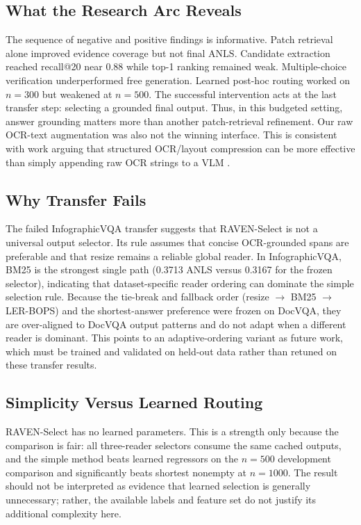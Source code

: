 \documentclass[journal]{IEEEtran}
\begin{document}
\subsection{What the Research Arc Reveals}
The sequence of negative and positive findings is informative.  Patch retrieval
alone improved evidence coverage but not final ANLS.  Candidate extraction
reached recall@20 near 0.88 while top-1 ranking remained weak.  Multiple-choice
verification underperformed free generation.  Learned post-hoc routing worked
on $n=300$ but weakened at $n=500$.  The successful intervention acts at the
last transfer step: selecting a grounded final output.  Thus, in this budgeted
setting, answer grounding matters more than another patch-retrieval refinement.
Our raw OCR-text augmentation was also not the winning interface.  This is
consistent with work arguing that structured OCR/layout compression can be more
effective than simply appending raw OCR strings to a VLM \cite{docvlm}.

\subsection{Why Transfer Fails}
The failed InfographicVQA transfer suggests that RAVEN-Select is not a universal
output selector.  Its rule assumes that concise OCR-grounded spans are preferable
and that resize remains a reliable global reader.  In InfographicVQA, BM25 is the
strongest single path (0.3713 ANLS versus 0.3167 for the frozen selector),
indicating that dataset-specific reader ordering can dominate the simple
selection rule.  Because the tie-break and fallback order (resize $\to$ BM25
$\to$ LER-BOPS) and the shortest-answer preference were frozen on DocVQA, they
are over-aligned to DocVQA output patterns and do not adapt when a different
reader is dominant.  This points to an adaptive-ordering variant as future work,
which must be trained and validated on held-out data rather than retuned on these
transfer results.

\subsection{Simplicity Versus Learned Routing}
RAVEN-Select has no learned parameters.  This is a strength only because the
comparison is fair: all three-reader selectors consume the same cached outputs,
and the simple method beats learned regressors on the $n=500$ development
comparison and significantly beats shortest nonempty at $n=1000$.  The result
should not be interpreted as evidence that learned selection is generally
unnecessary; rather, the available labels and feature set do not justify its
additional complexity here.
\end{document}
